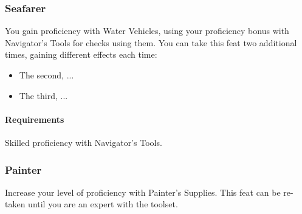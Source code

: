 \subsubsection{Seafarer} \label{feat::seafarer}
    You gain proficiency with Water Vehicles, using your proficiency bonus with Navigator's Tools for checks using them.
    You can take this feat two additional times, gaining different effects each time:
    \begin{itemize}
        \item The second, ...
        \item The third, ... %
    \end{itemize}
    \paragraph{Requirements} Skilled proficiency with Navigator's Tools.

\subsubsection{Painter} \label{feat::painter}
    Increase your level of proficiency with Painter's Supplies.
    This feat can be re-taken until you are an expert with the toolset.
